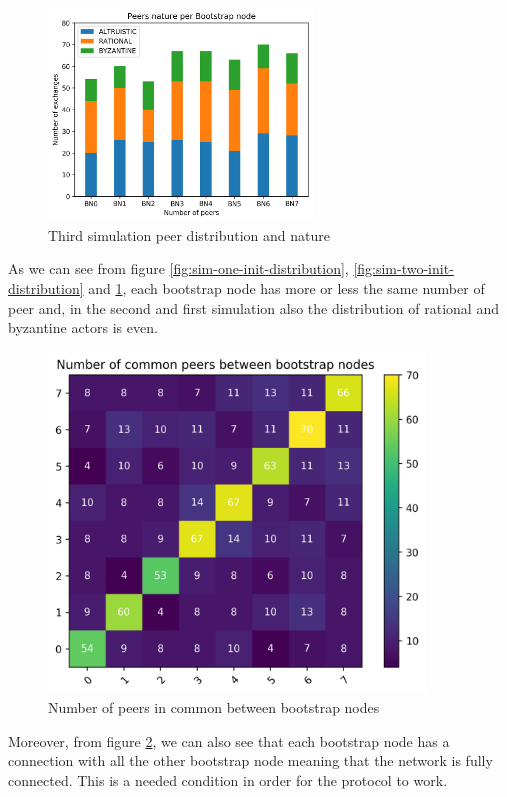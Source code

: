 \documentclass[mscthesis]{usiinfthesis}
\begin{document}
\begin{figure}[H]
  \centering
  \includegraphics[width=7cm]{images/3/3-peer-nature-per-bn.png}
  \caption{Third simulation peer distribution and nature}
  \label{fig:sim-three-init-distribution}
\end{figure}

As we can see from figure \ref{fig:sim-one-init-distribution}, \ref{fig:sim-two-init-distribution} and \ref{fig:sim-three-init-distribution}, each bootstrap node has more or less the same number of peer and, in the second and first simulation also the distribution of rational and byzantine actors is even. \\

\begin{figure}[H]
  \centering
  \includegraphics[width=10cm]{images/1/1-connectivity-heatmap.png}
  \caption{Number of peers in common between bootstrap nodes}
  \label{fig:connectivity-general}
\end{figure}

Moreover, from figure \ref{fig:connectivity-general}, we can also see that each bootstrap node has a connection with all the other bootstrap node meaning that the network is fully connected. This is a needed condition in order for the protocol to work. 
\end{document}
